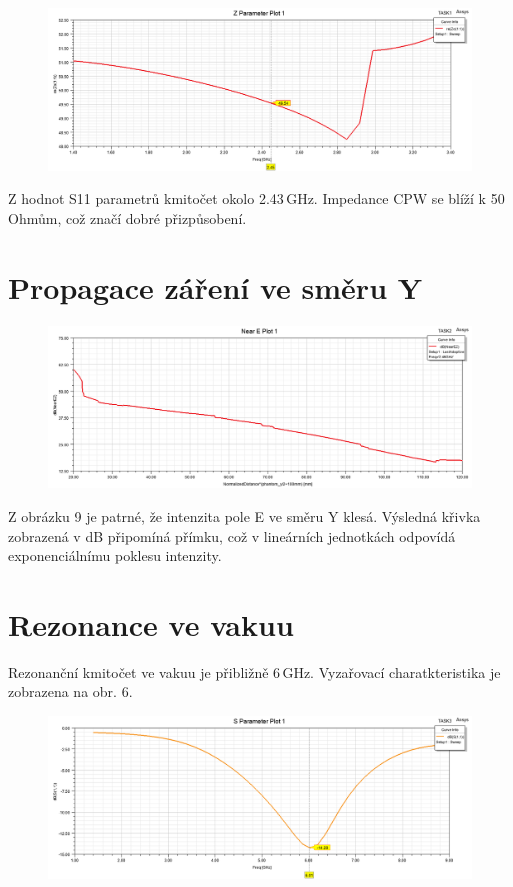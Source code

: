 \documentclass[10pt, a4paper]{article}%
\begin{document}
	\begin{figure}[ht!]
		\centering
		\includegraphics[width = 1\textwidth]{char_imp.png}
	\end{figure}

	Z hodnot S11 parametrů kmitočet okolo 2.43\,GHz. Impedance
	CPW se blíží k 50\,Ohmům, což značí dobré přizpůsobení.
	\clearpage
	\section{\Large Propagace záření ve směru Y}
	
	\begin{figure}[ht!]
		\centering
		\includegraphics[width = 1\textwidth]{Z_near.png}
	\end{figure}
	Z obrázku 9 je patrné, že intenzita pole E ve směru Y klesá. Výsledná křivka
	zobrazená v dB připomíná přímku, což v lineárních jednotkách odpovídá exponenciálnímu
	poklesu intenzity. 

	\section{\Large Rezonance ve vakuu}
	Rezonanční kmitočet ve vakuu je přibližně 6\,GHz. Vyzařovací charatkteristika je zobrazena na obr. 6.
	\begin{figure}[ht!]
		\centering
		\includegraphics[width = 1\textwidth]{S11_freespace.png}
	\end{figure}
\clearpage
\end{document}
